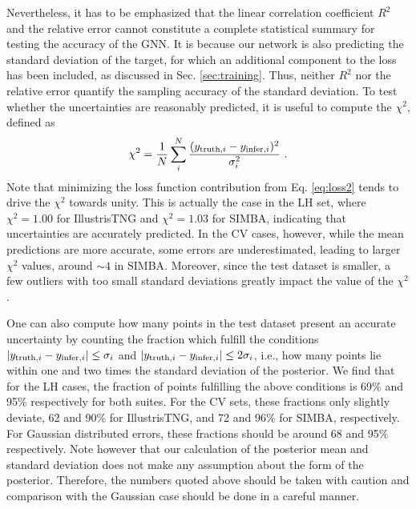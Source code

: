 \documentclass[twocolumn]{aastex631}
\begin{document}
Nevertheless, it has to be emphasized that the linear correlation coefficient $R^2$ and the relative error cannot constitute a complete statistical summary for testing the accuracy of the GNN. It is because our network is also predicting the standard deviation of the target, for which an additional component to the loss has been included, as discussed in Sec. \ref{sec:training}. Thus, neither $R^2$ nor the relative error quantify the sampling accuracy of the standard deviation. To test whether the uncertainties are reasonably predicted, it is useful to compute the $\chi^2$, defined as
\begin{equation}
    \chi^2 = \frac{1}{N} \sum_i^N \frac{(y_{{\rm truth}, i} - y_{{\rm infer}, i})^2}{\sigma_i^2}~.
\end{equation}
Note that minimizing the loss function contribution from Eq. \ref{eq:loss2} tends to drive the $\chi^2$ towards unity. This is actually the case in the LH set, where $\chi^2 = 1.00$ for IllustrisTNG and $\chi^2 = 1.03$ for SIMBA, indicating that uncertainties are accurately predicted. In the CV cases, however, while the mean predictions are more accurate, some errors are underestimated, leading to larger $\chi^2$ values, around $\sim 4$ in SIMBA. Moreover, since the test dataset is smaller, a few outliers with too small standard deviations greatly impact the value of the $\chi^2$.



One can also compute how many points in the test dataset present an accurate uncertainty by counting the fraction which fulfill the conditions $|y_{{\rm truth}, i} - y_{{\rm infer}, i}| \leq \sigma_i$ and $|y_{{\rm truth}, i} - y_{{\rm infer}, i}| \leq 2\sigma_i$, i.e., how many points lie within one and two times the standard deviation of the posterior. We find that for the LH cases, the fraction of points fulfilling the above conditions is 69\% and 95\% respectively for both suites. For the CV sets, these fractions only slightly deviate, 62 and 90\% for IllustrisTNG, and 72 and 96\% for SIMBA, respectively. For Gaussian distributed errors, these fractions should be around 68 and 95\% respectively. Note however that our calculation of the posterior mean and standard deviation does not make any assumption about the form of the posterior. Therefore, the numbers quoted above should be taken with caution and comparison with the Gaussian case should be done in a careful manner.
\end{document}

